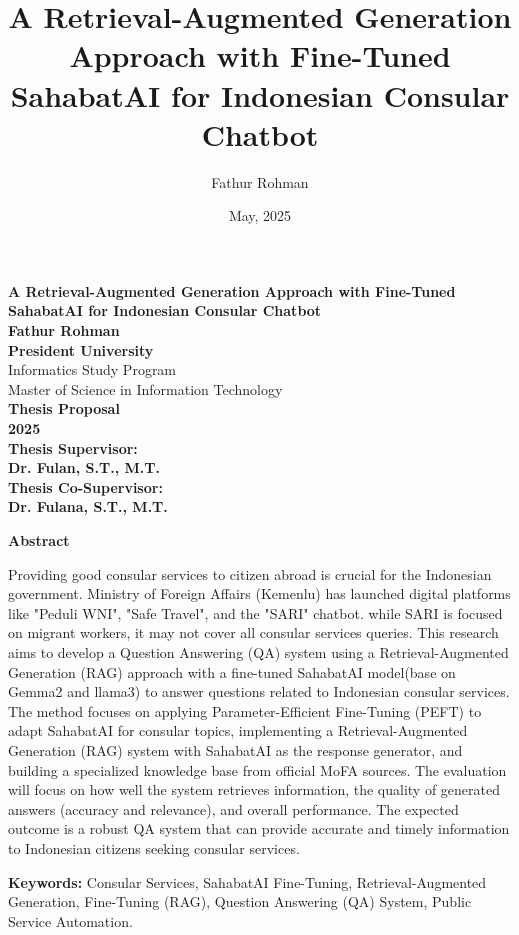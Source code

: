\documentclass[12pt]{report}
\title{A Retrieval-Augmented Generation Approach with Fine-Tuned SahabatAI for Indonesian Consular Chatbot
}
\author{Fathur Rohman}
\date{May, 2025}
\begin{document}
\sloppy
\begin{titlepage}
  \begin{center}
    \vspace*{2cm} %

    {\LARGE \textbf{A Retrieval-Augmented Generation Approach with Fine-Tuned SahabatAI for Indonesian Consular Chatbot}} \\[1.5cm]

    \textbf{Fathur Rohman} \\[1.5cm]

    \vspace{5cm} %
    \textbf{President University} \\[0.5em]
    Informatics Study Program \\[0.5em]
    Master of Science in Information Technology \\[0.5em]
    \textbf{Thesis Proposal} \\[0.5em]
    \textbf{2025} \\[0.5em]
    \textbf{Thesis Supervisor:} \\[0.5em]
    \textbf{Dr. Fulan, S.T., M.T.} \\[0.5em]
    \textbf{Thesis Co-Supervisor:} \\[0.5em]    
    \textbf{Dr. Fulana, S.T., M.T.} \\[0.5em]
  \end{center}
\end{titlepage}

\begin{center}
  \textbf{Abstract}
\end{center}
\begin{spacing}{1.5} %

Providing good consular services to citizen abroad is crucial for the Indonesian government. Ministry of Foreign Affairs (Kemenlu) has launched digital platforms like "Peduli WNI", "Safe Travel", and the "SARI" chatbot.
while SARI is focused on migrant workers, it may not cover all consular services queries. 
This research aims to develop a Question Answering (QA) system using a Retrieval-Augmented Generation (RAG) approach with a fine-tuned SahabatAI model(base on Gemma2 and llama3) to answer questions related to Indonesian consular services. 
The method focuses on applying Parameter-Efficient Fine-Tuning (PEFT) to adapt SahabatAI for consular topics, implementing a Retrieval-Augmented Generation (RAG) system with SahabatAI as the response generator, and building a specialized knowledge base from official MoFA sources.
The evaluation will focus on how well the system retrieves information, the quality of generated answers (accuracy and relevance), and overall performance.
The expected outcome is a robust QA system that can provide accurate and timely information to Indonesian citizens seeking consular services.

\textbf{Keywords:} Consular Services, SahabatAI Fine-Tuning, Retrieval-Augmented Generation, Fine-Tuning (RAG), Question Answering (QA) System, Public Service Automation.
\end{spacing}
\end{document}
